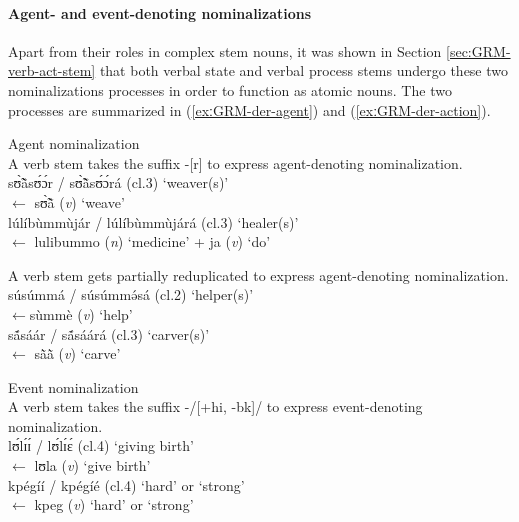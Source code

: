 \begin{exe}
\begin{exe}
\begin{exe}
\begin{exe}
\begin{exe}
\begin{exe}
\paragraph{Agent- and event-denoting nominalizations}
\label{sec:GRM-der-agent}

Apart from their roles in complex stem nouns, it was shown in Section \ref{sec:GRM-verb-act-stem} that both verbal state and verbal process stems undergo these two nominalizations processes in order to function as atomic nouns.
The two processes are summarized in (\ref{exːGRM-der-agent}) and 
(\ref{exːGRM-der-action}). 

\ea\label{exːGRM-der-agent}{\rm Agent nominalization}\\

\ea\label{exːGRM-der-agent-suffix}
{\rm A verb stem takes the suffix -[r]  to express agent-denoting
nominalization.}\\
{\sls  sʊ̃̀ã̀sʊ́ɔ́r} / {\sls sʊ̃̀ã̀sʊ́ɔ́rá} {\rm ({\sc cl.3}) `weaver(s)'}\\
  $\leftarrow$  {\sls sʊ̃̀ã̀} ({\it v}) {\rm  `weave'}\\
{\sls  lúlíbùmmùjár} / {\sls lúlíbùmmùjárá}  {\rm ({\sc cl.3})  `healer(s)' }
\\
 $\leftarrow$ {\sls lulibummo} ({\it n}) {\rm `medicine'} + {\sls ja} ({\it v})  {\rm `do'}


 \ex\label{exːGRM-der-agent-redup}
{\rm A verb stem gets partially reduplicated  to express
agent-denoting nominalization.}\\
{\sls  súsúmmá} / {\sls súsúmmə́sá} ({\sc cl.2})   {\rm`helper(s)'}\\
 $\leftarrow${\sls sùmmè} ({\it v})  {\rm `help'}\\
{\sls  sã́sáár} / {\sls sã́sáárá} ({\sc cl.3})  {\rm  `carver(s)'}\\
 $\leftarrow$ {\sls sã̀ã̀} ({\it v})  {\rm `carve' }

\z 
 \z


\begin{exe}
 \ex\label{exːGRM-der-action}{\rm Event nominalization}\\
{\rm A verb stem takes the suffix -/[{\sc +hi, -bk}]/   to express
event-denoting
nominalization.}\\
{\sls lʊ́lɪ́ɪ́ } / {\sls  lʊ́lɪ́ɛ́} ({\sc cl.4})  {\rm `giving birth'} \\
 $\leftarrow$ {\sls  lʊla} ({\it v})  {\rm `give birth' } \\
{\sls kpégíí} / {\sls   kpégíé}  ({\sc cl.4})  {\rm  `hard'  or
`strong'} \\
  $\leftarrow$ {\sls  kpeg} ({\it v})  {\rm `hard' or `strong'} \\
\z


\end{exe}
\end{exe}
\end{exe}
\end{exe}
\end{exe}
\end{exe}
\end{exe}
